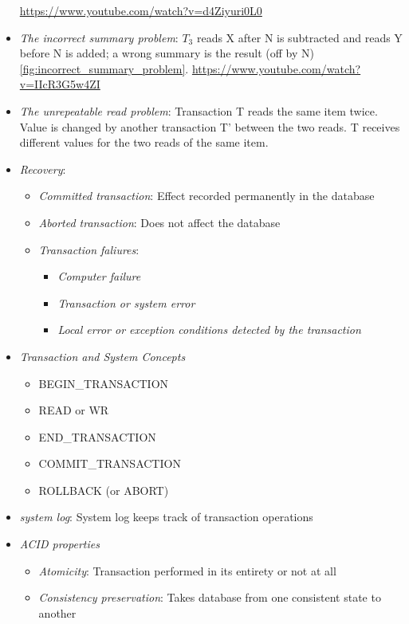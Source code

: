 \begin{itemize}
    \url{https://www.youtube.com/watch?v=d4Ziyuri0L0}
    \item \textit{The incorrect summary problem}: $T_3$ reads X after N is subtracted and reads Y before N is added; a wrong summary is the result (off by N) \ref{fig:incorrect_summary_problem}.
    \url{https://www.youtube.com/watch?v=IIcR3G5w4ZI}
    \item \textit{The unrepeatable read problem}: Transaction T reads the same item twice. Value is changed by another transaction T' between the two reads. T receives different values for the two reads of the same item.
    \item \textit{Recovery}: 
    \begin{itemize}
        \item \textit{Committed transaction}: Effect recorded permanently in the database
        \item \textit{Aborted transaction}: Does not affect the database
        \item \textit{Transaction faliures}:
        \begin{itemize}
            \item \textit{Computer failure}
            \item \textit{Transaction or system error}
            \item \textit{Local error or exception conditions detected by the transaction}
        \end{itemize}
    \end{itemize}
    \item \textit{Transaction and System Concepts}
    \begin{itemize}
        \item BEGIN\_TRANSACTION
        \item READ or WR
        \item END\_TRANSACTION
        \item COMMIT\_TRANSACTION
        \item ROLLBACK (or ABORT)
    \end{itemize}
    \item \textit{system log}: System log keeps track of transaction operations
    \item \textit{ACID properties}
    \begin{itemize}
        \item \textit{Atomicity}: Transaction performed in its entirety or not at all
        \item \textit{Consistency preservation}: Takes database from one consistent state to another

\end{itemize}
\end{itemize}
